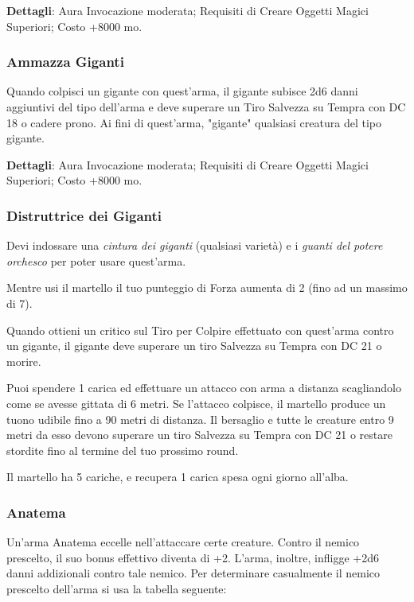 \begin{multicols}{2}
\textbf{Dettagli}: Aura Invocazione moderata; Requisiti di Creare Oggetti Magici Superiori; Costo +8000 mo.

\subsubsection*{Ammazza Giganti}

Quando colpisci un gigante con quest'arma, il gigante subisce 2d6 danni aggiuntivi del tipo dell'arma e deve superare un Tiro Salvezza su Tempra con DC 18 o cadere prono. Ai fini di quest'arma, "gigante" qualsiasi creatura del tipo gigante.

\textbf{Dettagli}: Aura Invocazione moderata; Requisiti di Creare Oggetti Magici Superiori; Costo +8000 mo.

\subsubsection*{Distruttrice dei Giganti}

Devi indossare una \textit{cintura dei giganti} (qualsiasi varietà) e i \textit{guanti del potere orchesco} per poter usare quest'arma.

Mentre usi il martello il tuo punteggio di Forza aumenta di 2 (fino ad un massimo di 7).

Quando ottieni un critico sul Tiro per Colpire effettuato con quest'arma contro un gigante, il gigante deve superare un tiro Salvezza su Tempra con DC 21 o morire.

Puoi spendere 1 carica ed effettuare un attacco con arma a distanza scagliandolo come se avesse gittata di 6 metri. Se l'attacco colpisce, il martello produce un tuono udibile fino a 90 metri di distanza. Il bersaglio e tutte le creature entro 9 metri da esso devono superare un tiro Salvezza su Tempra con DC 21 o restare stordite fino al termine del tuo prossimo round.

Il martello ha 5 cariche, e recupera 1 carica spesa ogni giorno all'alba.

\subsubsection*{Anatema}

Un'arma Anatema eccelle nell'attaccare certe creature. Contro il nemico prescelto, il suo bonus effettivo diventa di +2. L'arma, inoltre, infligge +2d6 danni addizionali contro tale nemico. Per determinare casualmente il nemico prescelto dell'arma si usa la tabella seguente:


\end{multicols}
